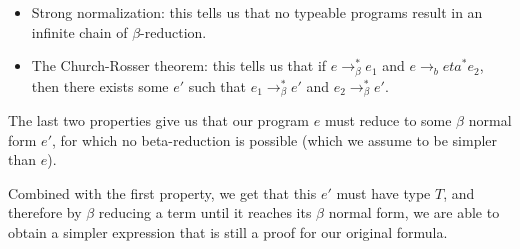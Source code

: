 \begin{enumerate}[label=(\alph*)]
\begin{itemize}
      \item
        Strong normalization: this tells us that no typeable programs result in an infinite chain of $\beta$-reduction.

      \item
        The Church-Rosser theorem: this tells us that if $e \rightarrow_\beta^* e_1$ and $e \rightarrow_beta^* e_2$, then there exists some $e'$ such that $e_1 \rightarrow_\beta^* e'$ and $e_2\rightarrow_\beta^* e'$.
    \end{itemize}

    The last two properties give us that our program $e$ must reduce to some $\beta$ normal form $e'$, for which no beta-reduction is possible (which we assume to be simpler than $e$).

    Combined with the first property, we get that this $e'$ must have type $T$, and therefore by $\beta$ reducing a term until it reaches its $\beta$ normal form, we are able to obtain a simpler expression that is still a proof for our original formula.
        
\end{enumerate}

